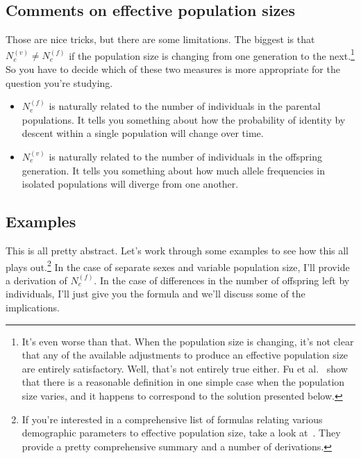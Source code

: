 \subsection*{Comments on effective population sizes}

Those are nice tricks, but there are some limitations. The biggest is
that $N_e^{(v)} \ne N_e^{(f)}$ if the population size is changing from
one generation to the next.\footnote{It's even worse than that. When
  the population size is changing, it's not clear that any of the
  available adjustments to produce an effective population size are
  entirely satisfactory. Well, that's not entirely true either. Fu et
  al.~\cite{Fu-etal-2003} show that there is a reasonable definition
  in one simple case when the population size varies, and it happens
  to correspond to the solution presented below.} So you have to
decide which of these two measures is more appropriate for the
question you're studying.

\begin{itemize}

\item $N_e^{(f)}$ is naturally related to the number of individuals in
the parental populations. It tells you something about how the
probability of identity by descent within a single population will
change over time.

\item $N_e^{(v)}$ is naturally related to the number of individuals in
the offspring generation. It tells you something about how much allele
frequencies in isolated populations will diverge from one another.

\end{itemize}

\subsection*{Examples}

This is all pretty abstract. Let's work through some examples to see
how this all plays out.\footnote{If you're interested in a
  comprehensive list of formulas relating various demographic
  parameters to effective population size, take a look
  at~\cite[p. 362]{Crow-Kimura-1970}. They provide a pretty
  comprehensive summary and a number of derivations.} In the case of
separate sexes and variable population size, I'll provide a derivation
of $N_e^{(f)}$. In the case of differences in the number of offspring
left by individuals, I'll just give you the formula and we'll discuss
some of the implications.

